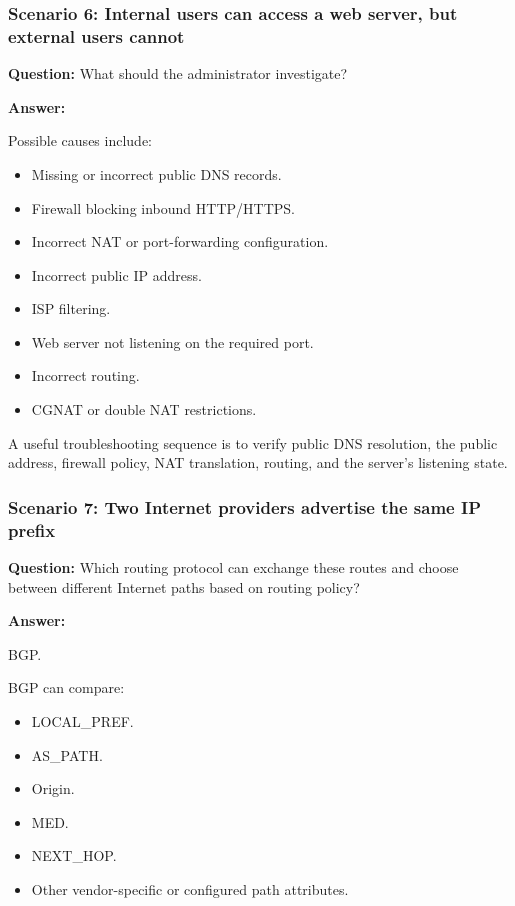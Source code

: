 \subsubsection*{Scenario 6: Internal users can access a web server, but external users cannot}

\textbf{Question:} What should the administrator investigate?

\textbf{Answer:}

Possible causes include:

\begin{itemize}
\item Missing or incorrect public DNS records.
\item Firewall blocking inbound HTTP/HTTPS.
\item Incorrect NAT or port-forwarding configuration.
\item Incorrect public IP address.
\item ISP filtering.
\item Web server not listening on the required port.
\item Incorrect routing.
\item CGNAT or double NAT restrictions.
\end{itemize}

A useful troubleshooting sequence is to verify public DNS resolution, the public address, firewall policy, NAT translation, routing, and the server's listening state.

\subsubsection*{Scenario 7: Two Internet providers advertise the same IP prefix}

\textbf{Question:} Which routing protocol can exchange these routes and choose between different Internet paths based on routing policy?

\textbf{Answer:}

BGP.

BGP can compare:

\begin{itemize}
\item LOCAL\_PREF.
\item AS\_PATH.
\item Origin.
\item MED.
\item NEXT\_HOP.
\item Other vendor-specific or configured path attributes.
\end{itemize}

